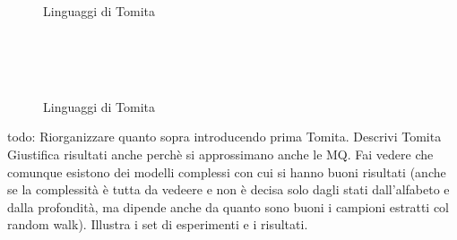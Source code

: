 \begin{figure}[htp]
\centering
{} \quad
{}\\

 \quad
{}\\

 \quad
{}\\

 \quad
{}\\
\caption{Linguaggi di Tomita}
\label{fig:ltom1}
\end{figure} 

\begin{figure}[htp]\ContinuedFloat
\centering
{} \quad
{}\\

 \quad
{}\\

 \quad
{}\\


\caption{Linguaggi di Tomita}
\label{fig:ltom2}
\end{figure} 
todo:
Riorganizzare quanto sopra introducendo prima Tomita.
Descrivi Tomita
Giustifica risultati anche perchè si approssimano anche le MQ.
Fai vedere che comunque esistono dei modelli complessi con cui si hanno buoni risultati (anche se la complessità è tutta da vedeere e non è decisa solo dagli stati dall'alfabeto e dalla profondità, ma dipende anche da quanto sono buoni i campioni estratti col random walk).
Illustra i set di esperimenti e i risultati.